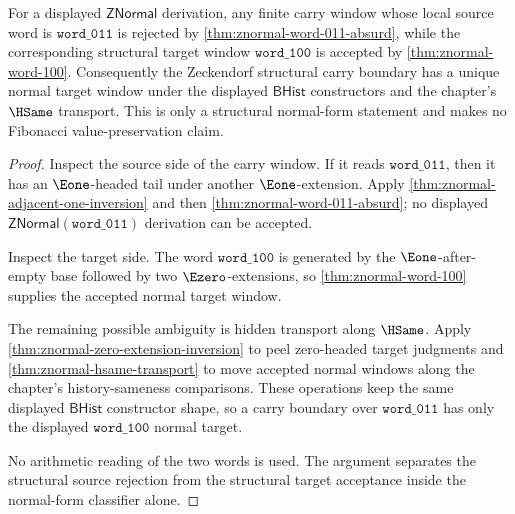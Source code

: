 \begin{theorem}
\label{thm:zeckendorf-normal-carry-window-determinacy}
For a displayed $\mathsf{ZNormal}$ derivation, any finite carry window whose
local source word is $\mathtt{word\_011}$ is rejected by
\autoref{thm:znormal-word-011-absurd}, while the corresponding structural
target window $\mathtt{word\_100}$ is accepted by
\autoref{thm:znormal-word-100}. Consequently the Zeckendorf structural carry
boundary has a unique normal target window under the displayed $\mathsf{BHist}$
constructors and the chapter's $\HSame$ transport. This is only a structural
normal-form statement and makes no Fibonacci value-preservation claim.
\end{theorem}
\begin{proof}
Inspect the source side of the carry window. If it reads
$\mathtt{word\_011}$, then it has an $\Eone$-headed tail under another
$\Eone$-extension. Apply
\autoref{thm:znormal-adjacent-one-inversion} and then
\autoref{thm:znormal-word-011-absurd}; no displayed
$\mathsf{ZNormal}(\mathtt{word\_011})$ derivation can be accepted.

Inspect the target side. The word $\mathtt{word\_100}$ is generated by the
$\Eone$-after-empty base followed by two $\Ezero$-extensions, so
\autoref{thm:znormal-word-100} supplies the accepted normal target window.

The remaining possible ambiguity is hidden transport along $\HSame$. Apply
\autoref{thm:znormal-zero-extension-inversion} to peel zero-headed target
judgments and \autoref{thm:znormal-hsame-transport} to move accepted normal
windows along the chapter's history-sameness comparisons. These operations keep
the same displayed $\mathsf{BHist}$ constructor shape, so a carry boundary over
$\mathtt{word\_011}$ has only the displayed $\mathtt{word\_100}$ normal target.

No arithmetic reading of the two words is used. The argument separates the
structural source rejection from the structural target acceptance inside the
normal-form classifier alone.
\end{proof}

